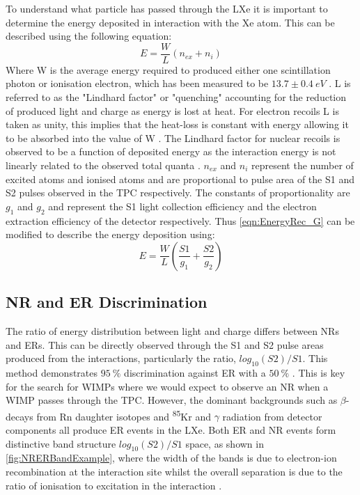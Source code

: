 To understand what particle has passed through the LXe it is important to determine the energy deposited in interaction with the Xe atom. This can be described using the following equation:
\begin{equation}
    E=\frac{W}{L}(n_{ex}+n_{i})
    \label{eqn:EnergyRec_noG}
\end{equation}
Where W is the average energy required to produced either one scintillation photon or ionisation electron, which has been measured to be $13.7\pm0.4~eV$ \cite{Goetzke:2016lfg, Dahl:2009nta}.
L is referred to as the "Lindhard factor" or "quenching" accounting for the reduction of produced light and charge as energy is lost at heat. For electron recoils L is taken as unity, this implies that the heat-loss is constant with energy allowing it to be absorbed into the value of W \cite{Rischbieter:2022}. The Lindhard factor for nuclear recoils is observed to be a function of deposited energy as the interaction energy is not linearly related to the observed total quanta \cite{Sorensen:2011bd}.
$n_{ex}$ and $n_{i}$ represent the number of excited atoms and ionised atoms and are proportional to pulse area of the S1 and S2 pulses observed in the TPC respectively. The constants of proportionality are $g_1$ and $g_2$ and represent the S1 light collection efficiency and the electron extraction efficiency of the detector respectively. Thus \autoref{eqn:EnergyRec_G} can be modified to describe the energy deposition using:
\begin{equation}
    E=\frac{W}{L}(\frac{S1}{g_1}+\frac{S2}{g_2})
    \label{eqn:EnergyRec_G}
\end{equation}

\subsection{NR and ER Discrimination}
The ratio of energy distribution between light and charge differs between NRs and ERs. This can be directly observed through the S1 and S2 pulse areas produced from the interactions, particularly the ratio, $log_{10}(S2)/S1$. This method demonstrates $95~\%$ discrimination against ER with a $50~\%$ \cite{lzSens}. This is key for the search for WIMPs where we would expect to observe an NR when a WIMP passes through the TPC. However, the dominant backgrounds such as $\beta$-decays from Rn daughter isotopes and \textsuperscript{85}Kr and $\gamma$ radiation from detector components all produce ER events in the LXe. Both ER and NR events form distinctive band structure $log_{10}(S2)/S1$ space, as shown in \autoref{fig:NRERBandExample}, where the width of the bands is due to electron-ion recombination at the interaction site whilst the overall separation is due to the ratio of ionisation to excitation in the interaction \cite{Dahl:2009nta}.

